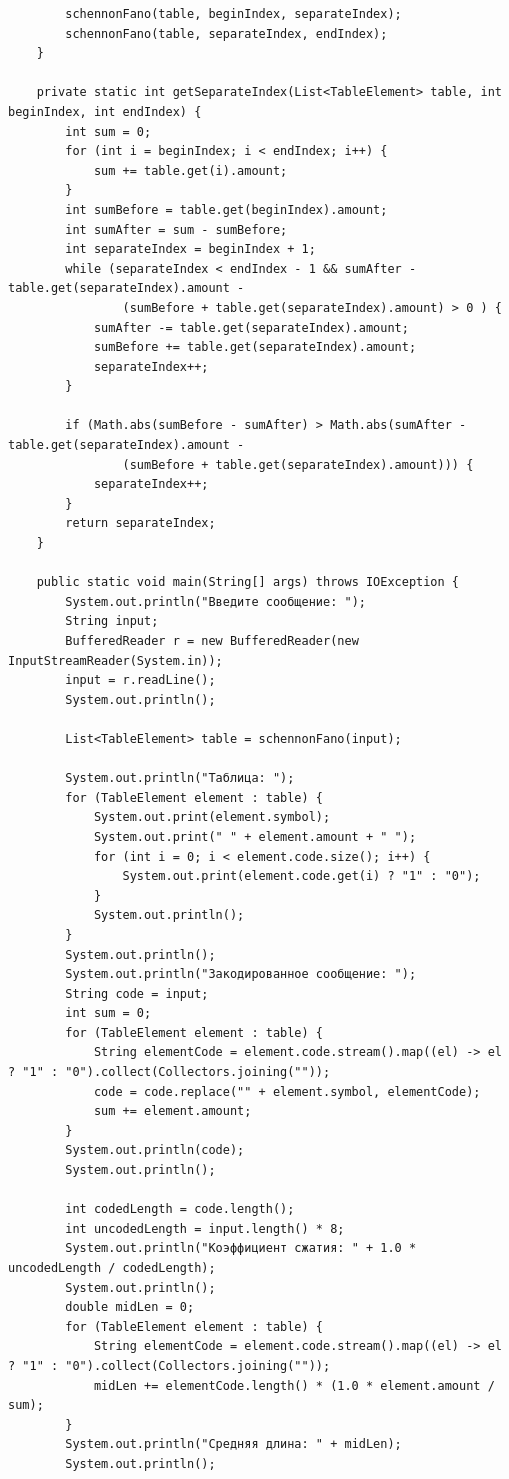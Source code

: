 \documentclass[a4paper,14pt]{extarticle}
\begin{document}
\begin{verbatim}
        schennonFano(table, beginIndex, separateIndex);
        schennonFano(table, separateIndex, endIndex);
    }

    private static int getSeparateIndex(List<TableElement> table, int beginIndex, int endIndex) {
        int sum = 0;
        for (int i = beginIndex; i < endIndex; i++) {
            sum += table.get(i).amount;
        }
        int sumBefore = table.get(beginIndex).amount;
        int sumAfter = sum - sumBefore;
        int separateIndex = beginIndex + 1;
        while (separateIndex < endIndex - 1 && sumAfter - table.get(separateIndex).amount -
                (sumBefore + table.get(separateIndex).amount) > 0 ) {
            sumAfter -= table.get(separateIndex).amount;
            sumBefore += table.get(separateIndex).amount;
            separateIndex++;
        }

        if (Math.abs(sumBefore - sumAfter) > Math.abs(sumAfter - table.get(separateIndex).amount -
                (sumBefore + table.get(separateIndex).amount))) {
            separateIndex++;
        }
        return separateIndex;
    }

    public static void main(String[] args) throws IOException {
        System.out.println("Введите сообщение: ");
        String input;
        BufferedReader r = new BufferedReader(new InputStreamReader(System.in));
        input = r.readLine();
        System.out.println();

        List<TableElement> table = schennonFano(input);

        System.out.println("Таблица: ");
        for (TableElement element : table) {
            System.out.print(element.symbol);
            System.out.print(" " + element.amount + " ");
            for (int i = 0; i < element.code.size(); i++) {
                System.out.print(element.code.get(i) ? "1" : "0");
            }
            System.out.println();
        }
        System.out.println();
        System.out.println("Закодированное сообщение: ");
        String code = input;
        int sum = 0;
        for (TableElement element : table) {
            String elementCode = element.code.stream().map((el) -> el ? "1" : "0").collect(Collectors.joining(""));
            code = code.replace("" + element.symbol, elementCode);
            sum += element.amount;
        }
        System.out.println(code);
        System.out.println();

        int codedLength = code.length();
        int uncodedLength = input.length() * 8;
        System.out.println("Коэффициент сжатия: " + 1.0 * uncodedLength / codedLength);
        System.out.println();
        double midLen = 0;
        for (TableElement element : table) {
            String elementCode = element.code.stream().map((el) -> el ? "1" : "0").collect(Collectors.joining(""));
            midLen += elementCode.length() * (1.0 * element.amount / sum);
        }
        System.out.println("Средняя длина: " + midLen);
        System.out.println();


\end{verbatim}
\end{document}
